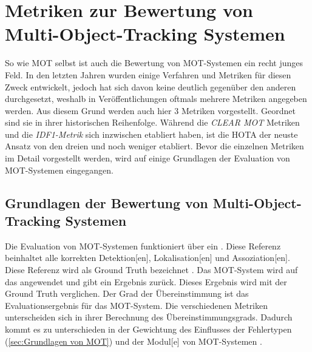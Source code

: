 \section{Metriken zur Bewertung von Multi-Object-Tracking Systemen}
So wie \gls{MOT} selbst ist auch die Bewertung von \gls{MOT}-Systemen ein recht junges Feld. In den letzten Jahren wurden einige Verfahren und Metriken für diesen Zweck entwickelt, jedoch hat sich davon keine deutlich gegenüber den anderen durchgesetzt, weshalb in Veröffentlichungen oftmals mehrere Metriken angegeben werden. Aus diesem Grund werden auch hier 3 Metriken vorgestellt. Geordnet sind sie in ihrer historischen Reihenfolge. Während die  \textit{\acrshort{CLEAR} \gls{MOT}} Metriken \cite{CLEAR.2008} und die \textit{\gls{IDF1}-Metrik} \cite{IDF1} sich inzwischen etabliert haben, ist die \gls{HOTA} \cite{HOTA} der neuste Ansatz von den dreien und noch weniger etabliert. Bevor die einzelnen Metriken im Detail vorgestellt werden, wird auf einige Grundlagen der Evaluation von \gls{MOT}-Systemen eingegangen.

\subsection{Grundlagen der Bewertung von Multi-Object-Tracking Systemen}
Die Evaluation von \gls{MOT}-Systemen funktioniert über ein . Diese Referenz beinhaltet alle korrekten \gls{Detektion}[en], \gls{Lokalisation}[en] und \gls{Assoziation}[en]. Diese Referenz wird als \gls{Ground Truth} bezeichnet  \cite{EMPTYCITE}. Das \gls{MOT}-System wird auf das  angewendet und gibt ein Ergebnis zurück. Dieses Ergebnis wird mit der \gls{Ground Truth} verglichen. Der Grad der Übereinstimmung ist das Evaluationsergebnis für das \gls{MOT}-System. Die verschiedenen Metriken unterscheiden sich in ihrer Berechnung des Übereinstimmungsgrads. Dadurch kommt es zu unterschieden in der Gewichtung des Einflusses der Fehlertypen (\ref{sec:Grundlagen von MOT}) und der \gls{Modul}[e] von \gls{MOT}-Systemen \cite{HOTA, IDF1, CLEAR.2008}.\par

